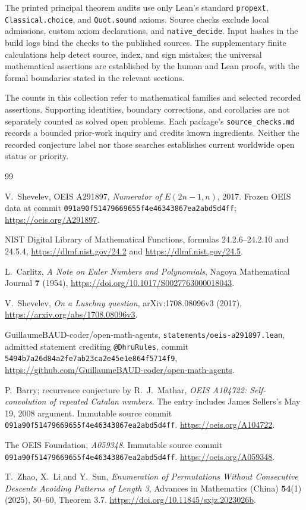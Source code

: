 \documentclass[11pt]{article}
\begin{document}
The printed principal theorem audits use only Lean's standard
\texttt{propext}, \texttt{Classical.choice}, and \texttt{Quot.sound}
axioms. Source checks exclude local admissions, custom axiom declarations,
and \texttt{native\_decide}. Input hashes in the build logs bind the
checks to the published sources. The supplementary finite calculations
help detect source, index, and sign mistakes; the universal mathematical
assertions are established by the human and Lean proofs, with the
formal boundaries stated in the relevant sections.

The counts in this collection refer to mathematical families and selected
recorded assertions. Supporting identities, boundary corrections, and
corollaries are not separately counted as solved open problems. Each
package's \texttt{source\_checks.md} records a bounded prior-work inquiry
and credits known ingredients. Neither the recorded conjecture label nor
those searches establishes current worldwide open status or priority.

\begin{thebibliography}{99}
\raggedright
{}
V.~Shevelev, OEIS A291897, \emph{Numerator of $E(2n-1,n)$}, 2017.
Frozen OEIS data at commit \texttt{091a90f51479669655f4e46343867ea2abd5d4ff};
\url{https://oeis.org/A291897}.

NIST Digital Library of Mathematical Functions,
formulas 24.2.6--24.2.10 and 24.5.4,
\url{https://dlmf.nist.gov/24.2} and \url{https://dlmf.nist.gov/24.5}.

L.~Carlitz, \emph{A Note on Euler Numbers and Polynomials},
Nagoya Mathematical Journal \textbf{7} (1954),
\url{https://doi.org/10.1017/S0027763000018043}.

V.~Shevelev, \emph{On a Luschny question}, arXiv:1708.08096v3 (2017),
\url{https://arxiv.org/abs/1708.08096v3}.

GuillaumeBAUD-coder/open-math-agents,
\texttt{statements/oeis-a291897.lean}, admitted statement crediting
\texttt{@DhruRules}, commit
\texttt{5494b7a26d84a2fe7ab23ca2e45e1e864f5714f9},
\url{https://github.com/GuillaumeBAUD-coder/open-math-agents}.


P.~Barry; recurrence conjecture by R.~J.~Mathar,
\emph{OEIS A104722: Self-convolution of repeated Catalan numbers}.
The entry includes James Sellers's May 19, 2008 argument.
Immutable source commit
\texttt{091a90f51479669655f4e46343867ea2abd5d4ff}.
\url{https://oeis.org/A104722}.

The OEIS Foundation, \emph{A059348}.
Immutable source commit
\texttt{091a90f51479669655f4e46343867ea2abd5d4ff}.
\url{https://oeis.org/A059348}.

T.~Zhao, X.~Li and Y.~Sun,
\emph{Enumeration of Permutations Without Consecutive Descents
Avoiding Patterns of Length 3},
Advances in Mathematics (China) \textbf{54}(1) (2025), 50--60,
Theorem 3.7. \url{https://doi.org/10.11845/sxjz.2023026b}.

\end{thebibliography}
\end{document}
